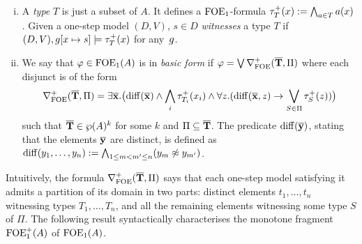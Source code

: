 \begin{definition}%
\begin{enumerate}[(i)]
\item A \emph{type} $T$ is just a subset of $A$. It defines a $\mathrm{FOE}_1$-formula $\tau^{+}_T(x) \mathrel{: =} \bigwedge_{a \in T} a(x)$. Given a one-step model $(D,V)$, $s \in D$ \emph{witnesses} a type $T$ if $(D,V), g[x\mapsto s] \models \tau^{+}_T(x)$ for any~$g$.
\item We say that $\varphi \in \mathrm{FOE}_1(A)$ is in \emph{basic form} if $\varphi = \bigvee \nabla^+_{\mathrm{FOE}}(\overline{{\mathbf{T}}},\Pi)$ where each disjunct is of the form
%
\begin{equation*}%
\posdbnfofoe{\vlist{T}}{\Pi} = \exists \vlist{x}.\big(\arediff{\vlist{x}} \land \bigwedge_i \tau^{+}_{T_i}(x_i) \land \forall z.(\arediff{\vlist{x},z} \lthen \bigvee_{S\in \Pi} \tau^{+}_S(z))\big)
\end{equation*}
%
such that $\overline{{\mathbf{T}}} \in \wp(A)^k$ for some $k$ and $\Pi \subseteq \overline{{\mathbf{T}}}$.  The predicate $\mathrm{diff}(\overline{{\mathbf{y}}})$, stating that the elements $\overline{{\mathbf{y}}}$ are distinct, is defined as $\mathrm{diff}(y_1,\dots,y_n) := \bigwedge_{1\leq m < m^{\prime} \leq n} (y_m \not\approx y_{m^{\prime}})$.
\end{enumerate}
\end{definition}

Intuitively, the formula $\nabla^+_{\mathrm{FOE}}(\overline{{\mathbf{T}}},\Pi)$ says that each one-step model satisfying it admits a partition of its domain in two parts: distinct elements $t_1,\dots,t_n$ witnessing types $T_1,\dots,T_n$, and all the remaining elements witnessing some type $S$ of $\Pi$. The following result syntactically characterises the monotone fragment $\mathrm{FOE}_1^+(A)$ of $\mathrm{FOE}_1(A)$.


